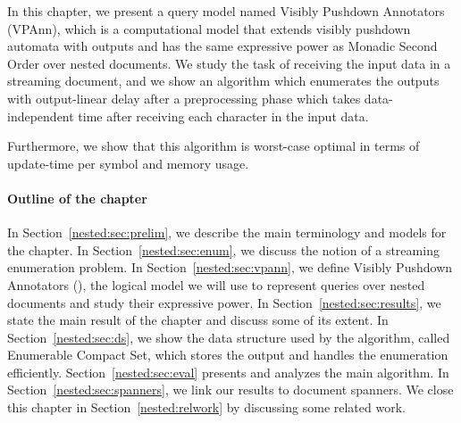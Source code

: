 
In this chapter, we present a query model named Visibly Pushdown Annotators (VPAnn), which is a computational model that extends visibly pushdown automata with outputs and has the same expressive power as Monadic Second Order over nested documents. We study the task of receiving the input data in a streaming document, and we show an algorithm which enumerates the outputs with output-linear delay after a preprocessing phase which takes data-independent time after receiving each character in the input data.

Furthermore, we show that this algorithm is worst-case optimal in terms of update-time per symbol and memory usage.

\paragraph{Outline of the chapter} 
In Section~\ref{nested:sec:prelim}, we describe the main terminology and models for the chapter. 
In Section~\ref{nested:sec:enum}, we discuss the notion of a streaming enumeration problem. 
In Section~\ref{nested:sec:vpann}, we define Visibly Pushdown Annotators (\vpann), the logical model we will use to represent queries over nested documents and study their expressive power. In Section~\ref{nested:sec:results}, we state the main result of the chapter and discuss some of its extent. In Section~\ref{nested:sec:ds}, we show the data structure used by the algorithm, called Enumerable Compact Set, which stores the output and handles the enumeration efficiently. Section~\ref{nested:sec:eval} presents and analyzes the main algorithm. In Section~\ref{nested:sec:spanners}, we link our results to document spanners. 
We close this chapter in Section~\ref{nested:relwork} by discussing some related work. 

%




